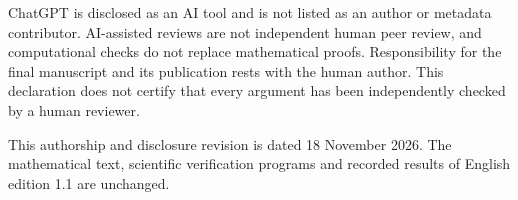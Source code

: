 \documentclass[
]{article}
\begin{document}
ChatGPT is disclosed as an AI tool and is not listed as an author or
metadata contributor. AI-assisted reviews are not independent human peer
review, and computational checks do not replace mathematical proofs.
Responsibility for the final manuscript and its publication rests with
the human author. This declaration does not certify that every argument
has been independently checked by a human reviewer.

This authorship and disclosure revision is dated 18 November 2026. The
mathematical text, scientific verification programs and recorded results
of English edition 1.1 are unchanged.
\end{document}
